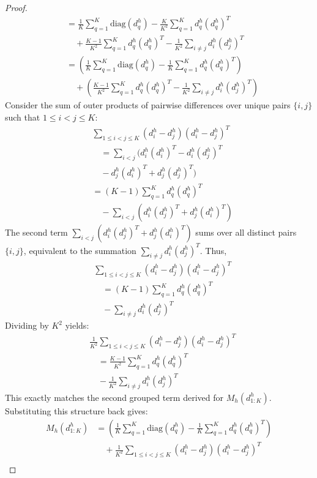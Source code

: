 \documentclass{article}
\begin{document}
\begin{proof}
\begin{align*}
&= \frac{1}{K} \sum_{q=1}^K \mathrm{diag}(d^h_q)
 - \frac{K}{K^2} \sum_{q=1}^K d^h_q (d^h_q)^T \\
&\quad + \frac{K-1}{K^2} \sum_{q=1}^K d^h_q (d^h_q)^T
 - \frac{1}{K^2} \sum_{i \neq j} d^h_i (d^h_j)^T \\
&= \left( \frac{1}{K} \sum_{q=1}^K \mathrm{diag}(d^h_q) - \frac{1}{K} \sum_{q=1}^K d^h_q (d^h_q)^T \right) \\
&\quad + \left( \frac{K-1}{K^2} \sum_{q=1}^K d^h_q (d^h_q)^T - \frac{1}{K^2} \sum_{i \neq j} d^h_i (d^h_j)^T \right)
\end{align*}
Consider the sum of outer products of pairwise differences over unique pairs $\{i, j\}$ such that $1 \le i < j \le K$:
\begin{align*}
&\sum_{1 \le i < j \le K} (d^h_i - d^h_j)(d^h_i - d^h_j)^T \\
&\quad = \sum_{i<j} \Big( d^h_i (d^h_i)^T - d^h_i (d^h_j)^T \\
&\quad - d^h_j (d^h_i)^T + d^h_j (d^h_j)^T \Big) \\
&= (K-1) \sum_{q=1}^K d^h_q (d^h_q)^T \\
&\quad - \sum_{i<j} \left( d^h_i (d^h_j)^T + d^h_j (d^h_i)^T \right)
\end{align*}
The second term $\sum_{i<j} ( d^h_i (d^h_j)^T + d^h_j (d^h_i)^T )$ sums over all distinct pairs $\{i, j\}$, equivalent to the summation $\sum_{i \neq j} d^h_i (d^h_j)^T$. Thus,
\begin{align*}
&\sum_{1 \le i < j \le K} (d^h_i - d^h_j)(d^h_i - d^h_j)^T \\
&\quad = (K-1) \sum_{q=1}^K d^h_q (d^h_q)^T \\
&\quad - \sum_{i \neq j} d^h_i (d^h_j)^T
\end{align*}
Dividing by $K^2$ yields:
\begin{align*}
&\frac{1}{K^2} \sum_{1 \le i < j \le K} (d^h_i - d^h_j)(d^h_i - d^h_j)^T \\
&\quad = \frac{K-1}{K^2} \sum_{q=1}^K d^h_q (d^h_q)^T \\
&\quad - \frac{1}{K^2} \sum_{i \neq j} d^h_i (d^h_j)^T
\end{align*}
This exactly matches the second grouped term derived for $M_h(d_{1:K}^h)$. Substituting this structure back gives:
\begin{align*}
M_h(d_{1:K}^h)
&= \left( \frac{1}{K} \sum_{q=1}^K \mathrm{diag}(d^h_q) - \frac{1}{K} \sum_{q=1}^K d^h_q (d^h_q)^T \right) \\
&\quad + \frac{1}{K^2} \sum_{1 \le i < j \le K} (d^h_i - d^h_j)(d^h_i - d^h_j)^T \\

\end{align*}
\end{proof}
\end{document}
